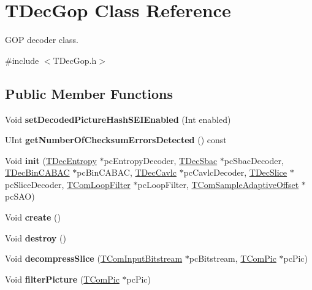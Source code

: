 \hypertarget{class_t_dec_gop}{}\section{T\+Dec\+Gop Class Reference}
\label{class_t_dec_gop}


G\+OP decoder class.  




{\ttfamily \#include $<$T\+Dec\+Gop.\+h$>$}

\subsection*{Public Member Functions}
\begin{DoxyCompactItemize}
\item 
\mbox{\label{class_t_dec_gop_aa3760ab8b6e6c688d422f5dcd196f03a}} 
Void {\bfseries set\+Decoded\+Picture\+Hash\+S\+E\+I\+Enabled} (Int enabled)
\item 
\mbox{\label{class_t_dec_gop_a52eecafa198f0ab66f4e3bec6d14832a}} 
U\+Int {\bfseries get\+Number\+Of\+Checksum\+Errors\+Detected} () const
\end{DoxyCompactItemize}
{\bf }\par
\begin{DoxyCompactItemize}
\item 
\mbox{\label{class_t_dec_gop_a18688c2c0fff1c5344563e9f669f616d}} 
Void {\bfseries init} (\hyperlink{class_t_dec_entropy}{T\+Dec\+Entropy} $\ast$pc\+Entropy\+Decoder, \hyperlink{class_t_dec_sbac}{T\+Dec\+Sbac} $\ast$pc\+Sbac\+Decoder, \hyperlink{class_t_dec_bin_c_a_b_a_c}{T\+Dec\+Bin\+C\+A\+B\+AC} $\ast$pc\+Bin\+C\+A\+B\+AC, \hyperlink{class_t_dec_cavlc}{T\+Dec\+Cavlc} $\ast$pc\+Cavlc\+Decoder, \hyperlink{class_t_dec_slice}{T\+Dec\+Slice} $\ast$pc\+Slice\+Decoder, \hyperlink{class_t_com_loop_filter}{T\+Com\+Loop\+Filter} $\ast$pc\+Loop\+Filter, \hyperlink{class_t_com_sample_adaptive_offset}{T\+Com\+Sample\+Adaptive\+Offset} $\ast$pc\+S\+AO)
\item 
\mbox{\label{class_t_dec_gop_a3df4945edabc6915c0f715744fbfbc48}} 
Void {\bfseries create} ()
\item 
\mbox{\label{class_t_dec_gop_ac4d25d16df6e60141feefb6155bb07ba}} 
Void {\bfseries destroy} ()
\item 
\mbox{\label{class_t_dec_gop_ab85efb8b3efa681ad91520be0edde2c2}} 
Void {\bfseries decompress\+Slice} (\hyperlink{class_t_com_input_bitstream}{T\+Com\+Input\+Bitstream} $\ast$pc\+Bitstream, \hyperlink{class_t_com_pic}{T\+Com\+Pic} $\ast$pc\+Pic)
\item 
\mbox{\label{class_t_dec_gop_afb7c81be18705db924a4f5b534175239}} 
Void {\bfseries filter\+Picture} (\hyperlink{class_t_com_pic}{T\+Com\+Pic} $\ast$pc\+Pic)
\end{DoxyCompactItemize}
